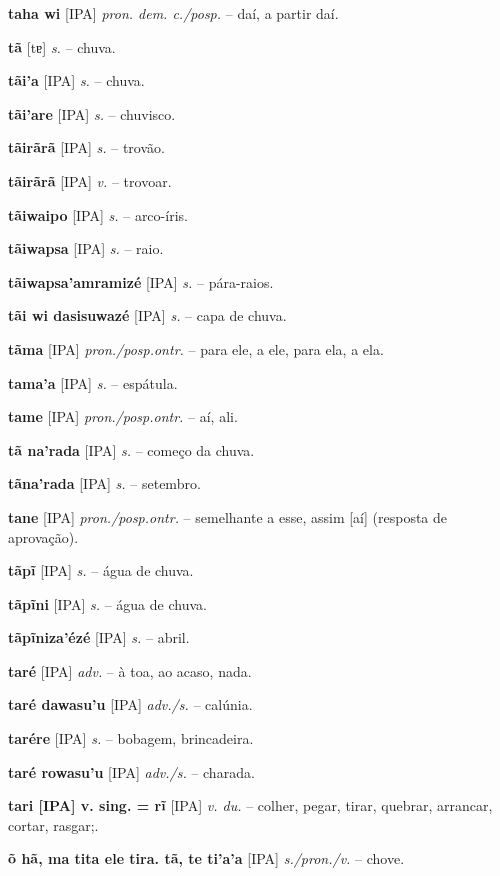\textbf{taha wi} [IPA] \textit{pron. dem. c./posp.} -- daí, a partir daí.

\textbf{tã} [tɐ] \textit{s.} -- chuva. \href{https://xavante.pythonanywhere.com/static/dicionario/play.html?file=rain.wav}{\faHeadphones}

\textbf{tãi'a} [IPA] \textit{s.} -- chuva.

\textbf{tãi'are} [IPA] \textit{s.} -- chuvisco.

\textbf{tãirãrã} [IPA] \textit{s.} -- trovão.

\textbf{tãirãrã} [IPA] \textit{v.} -- trovoar.

\textbf{tãiwaipo} [IPA] \textit{s.} -- arco-íris.

\textbf{tãiwapsa} [IPA] \textit{s.} -- raio.

\textbf{tãiwapsa'amramizé} [IPA] \textit{s.} -- pára-raios.

\textbf{tãi wi dasisuwazé} [IPA] \textit{s.} -- capa de chuva.

\textbf{tãma} [IPA] \textit{pron./posp.ontr.} -- para ele, a ele, para ela, a ela.

\textbf{tama'a} [IPA] \textit{s.} -- espátula.

\textbf{tame} [IPA] \textit{pron./posp.ontr.} -- aí, ali.

\textbf{tã na'rada} [IPA] \textit{s.} -- começo da chuva.

\textbf{tãna'rada} [IPA] \textit{s.} -- setembro.

\textbf{tane} [IPA] \textit{pron./posp.ontr.} -- semelhante a esse, assim [aí] (resposta de aprovação).

\textbf{tãpĩ} [IPA] \textit{s.} -- água de chuva.

\textbf{tãpĩni} [IPA] \textit{s.} -- água de chuva.

\textbf{tãpĩniza'ézé} [IPA] \textit{s.} -- abril.

\textbf{taré} [IPA] \textit{adv.} -- à toa, ao acaso, nada.

\textbf{taré dawasu'u} [IPA] \textit{adv./s.} -- calúnia.

\textbf{tarére} [IPA] \textit{s.} -- bobagem, brincadeira.

\textbf{taré rowasu'u} [IPA] \textit{adv./s.} -- charada.

\textbf{tari [IPA] v. sing. = rĩ} [IPA] \textit{v. du.} -- colher, pegar, tirar, quebrar, arrancar, cortar, rasgar;.

\textbf{õ hã, ma tita ele tira. tã, te ti'a'a} [IPA] \textit{s./pron./v.} -- chove.


